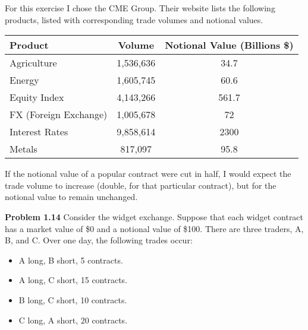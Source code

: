 \documentclass[12pt]{article}
\newcommand{\problem}[1]{\bigskip \noindent \textbf{Problem #1}}
\theoremstyle{plain}
\begin{document}
For this exercise I chose the CME Group. Their website lists the following products, listed with corresponding trade volumes and notional values.
\begin{center}
\begin{tabular}{l||cc}
Product & Volume & Notional Value (Billions \$) \\ \hline \hline
Agriculture & 1,536,636 & 34.7 \\
Energy & 1,605,745 & 60.6 \\
Equity Index & 4,143,266 & 561.7 \\
FX (Foreign Exchange) & 1,005,678 & 72 \\
Interest Rates & 9,858,614 & 2300 \\
Metals & 817,097 & 95.8
\end{tabular}
\end{center}

If the notional value of a popular contract were cut in half, I would expect the trade volume to increase (double, for that particular contract), but for the notional value to remain unchanged.

\problem{1.14} Consider the widget exchange. Suppose that each widget contract has a market value of \$0 and a notional value of \$100. There are three traders, A, B, and C. Over one day, the following trades occur:
\begin{itemize}
\item A long, B short, 5 contracts.
\item A long, C short, 15 contracts.
\item B long, C short, 10 contracts.
\item C long, A short, 20 contracts.
\end{itemize}
\end{document}
